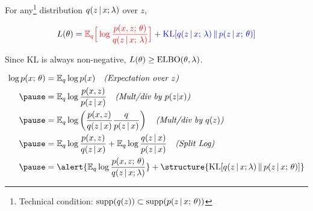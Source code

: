 \begin{frame}

For any\footnote{Technical condition: $\text{supp}(q(z)) \subset \text{supp}(p(z \,|\, x ; \, \theta))$} distribution $q(z\,|\, x; \lambda)$ over $z$, 

\[ L(\theta) = \textcolor{red}{\mathbb{E}_{q}\Big[\log \frac{p(x, z ; \, \theta)}{q(z\,|\, x ; \,\lambda)} \Big]} + \textcolor{blue}{\operatorname*{KL}[q(z\,|\, x ; \, \lambda)  \, \Vert \, p(z \,|\, x ; \, \theta)]}\] 

\begin{center}
\end{center}


Since KL is always non-negative, $L(\theta) \geq \operatorname*{ELBO}(\theta, \lambda)$. 
\end{frame}

\begin{frame}
{\small
\begin{align*}
\log p(x \param \theta) &=\E_{q} \log p(x)  \quad  \text{\it (Expectation over $z$)} \\ \pause
&= \E_{q} \log \frac{p(x, z)}{p(z \given x)} \quad \text{\it (Mult/div by $p(z|x)$)}\\ \pause
&= \E_{q} \log \left( \frac{p(x, z )}{q(z\given x)} \frac{q}{p(z \given x)} \right) \quad \text{\it (Mult/div by $q(z)$)}\\ \pause
&= \E_{q} \log \frac{p(x, z )}{q(z\given x )}  + \E_{q}  \log \frac{q(z \given x)}{p(z \given x )}  \quad  \text{\it (Split Log)}\\ \pause
&= \alert{\E_{q}  \log \frac{p(x, z \param \theta)}{q(z\given x;\lambda )}} + \structure{\KL[q(z \given x;\lambda)  \, \Vert \, p(z \given x \param \theta)]}  \\
\end{align*}
}
\end{frame}


